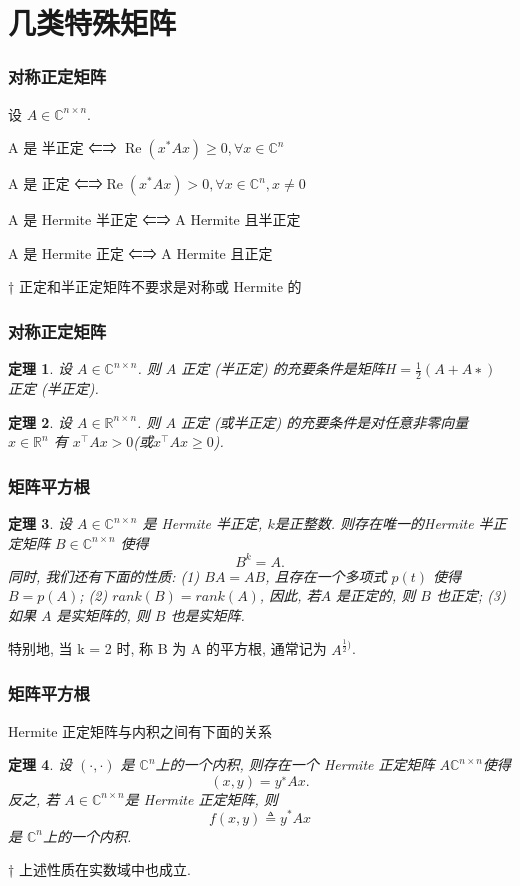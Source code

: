 \documentclass[notheorems,serif]{beamer}
\newcommand{\hei}[1]{{\HEI#1}}
\newtheorem{theorem}{\hei{定理}}
\begin{document}
\section{几类特殊矩阵}
\begin{frame}
\frametitle{对称正定矩阵}
设 $A ∈ \mathbb{C}^{n×n}$.

A 是 半正定 ⇐⇒ $\operatorname{Re}\left(x^{*} A x\right) \geq 0, \forall x \in \mathbb{C}^{n}$

A 是 正定 ⇐⇒$\operatorname{Re}\left(x^{*} A x\right)>0, \forall x \in \mathbb{C}^{n}, x \neq 0$

A 是 Hermite 半正定 ⇐⇒ A Hermite 且半正定

A 是 Hermite 正定 ⇐⇒ A Hermite 且正定

† 正定和半正定矩阵不要求是对称或 Hermite 的
\end{frame}

\begin{frame}
\frametitle{对称正定矩阵}
\begin{theorem}
	设 $A ∈ \mathbb{C}^{n×n}$. 则 $A$ 正定 (半正定) 的充要条件是矩阵$ H =\frac{1}{2}(A +A∗)$ 正定 (半正定). 
\end{theorem}

\begin{theorem}
	设 $A ∈ \mathbb{R}^{n×n}$. 则 $A$ 正定 (或半正定) 的充要条件是对任意非零向量 $x ∈ \mathbb{R}^n$ 有 $x^{⊺}Ax > 0 $(或$ x^{⊺}Ax ≥ 0$). 
\end{theorem}
\end{frame}

\begin{frame}
\frametitle{矩阵平方根}
\begin{theorem}
	设 $A ∈ \mathbb{C}^{n×n}$ 是 Hermite 半正定, $k $是正整数. 则存在唯一的Hermite 半正定矩阵 $B ∈ \mathbb{C}^{n×n}$ 使得
	$$B^k = A.$$
	同时, 我们还有下面的性质:
	(1) $BA = AB$, 且存在一个多项式 $p(t)$ 使得$ B = p(A)$;
	(2) $rank(B) = rank(A)$, 因此, 若$ A$ 是正定的, 则 $B$ 也正定;
	(3) 如果 $A$ 是实矩阵的, 则 $B$ 也是实矩阵.
\end{theorem}


特别地, 当 k = 2 时, 称 B 为 A 的平方根, 通常记为 $A^{\frac{1}{2})}$.
\end{frame}

\begin{frame}
\frametitle{矩阵平方根}
Hermite 正定矩阵与内积之间有下面的关系

\begin{theorem}
	设 $(·, ·)$ 是 $\mathbb{C}^n$上的一个内积, 则存在一个 Hermite 正定矩阵 $A  \mathbb{C}^{n×n}$使得
	$$(x, y) = y^∗Ax.$$
	反之, 若 $A ∈  \mathbb{C}^{n×n} $是 Hermite 正定矩阵, 则
	$$
	f(x, y) \triangleq y^{*} A x
	$$
	是 $\mathbb{C}^n $上的一个内积. 
\end{theorem}

† 上述性质在实数域中也成立.
\end{frame}
\end{document}
